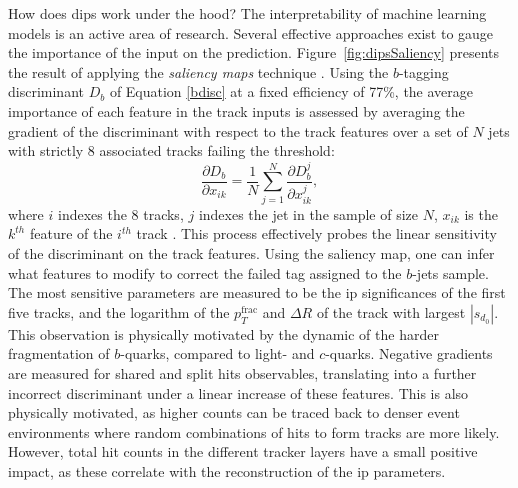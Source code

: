 How does \gls{dips} work under the hood? The interpretability of machine learning models is an active area of research. Several effective approaches exist to gauge the importance of the input on the prediction. Figure~\ref{fig:dipsSaliency} presents the result of applying the \textit{saliency maps} technique \cite{Simonyan2013DeepIC}. Using the $b$-tagging discriminant $D_b$ of Equation \ref{bdisc} at a fixed efficiency of 77\%, the average importance of each feature in the track inputs is assessed by averaging the gradient of the discriminant with respect to the track features over a set of $N$ jets with strictly 8 associated tracks failing the threshold:
\begin{equation}
  \frac{\partial D_b}{\partial x_{ik}} = \frac{1}{N} \sum_{j=1}^N \frac{\partial D_b^{j}}{\partial x_{ik}^{j}},
\end{equation} 
where $i$ indexes the 8 tracks, $j$ indexes the jet in the sample of size $N$, $x_{ik}$ is the $k^{th}$ feature of the $i^{th}$ track \cite{ATL-PHYS-PUB-2020-014}. This process effectively probes the linear sensitivity of the discriminant on the track features. Using the saliency map, one can infer what features to modify to correct the failed tag assigned to the $b$-jets sample. The most sensitive parameters are measured to be the \gls{ip} significances of the first five tracks, and the logarithm of the $p_T^{\textrm{frac}}$ and $\Delta R$ of the track with largest $|s_{d_0}|$. This observation is physically motivated by the dynamic of the harder fragmentation of $b$-quarks, compared to light- and $c$-quarks. Negative gradients are measured for shared and split hits observables, translating into a further incorrect discriminant under a linear increase of these features. This is also physically motivated, as higher counts can be traced back to denser event environments where random combinations of hits to form tracks are more likely. However, total hit counts in the different tracker layers have a small positive impact, as these correlate with the reconstruction of the \gls{ip} parameters.

